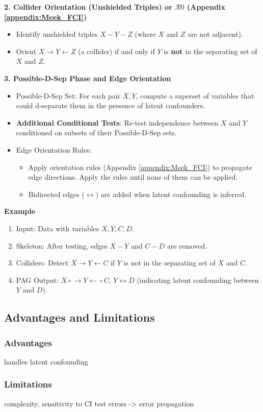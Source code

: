 \documentclass[main.tex]{subfiles}
\begin{document}
\textbf{2. Collider Orientation (Unshielded Triples) or $\mathcal{R}0$ (Appendix \ref{appendix:Meek_FCI})}
\begin{itemize}
  \item Identify unshielded triples $X - Y - Z$ (where $X$ and $Z$ are not adjacent).
  \item Orient $X \rightarrow Y \leftarrow Z$ (a collider) if and only if $Y$ is \textbf{not} in the separating set of $X$ and $Z$.
\end{itemize}

\textbf{3. Possible-D-Sep Phase and Edge Orientation}
\begin{itemize}
  \item Possible-D-Sep Set: For each pair $X, Y$, compute a superset of variables that could d-separate them in the presence of latent confounders.
  \item \textbf{Additional Conditional Tests}: Re-test independence between $X$ and $Y$ conditioned on subsets of their Possible-D-Sep sets.
  \item Edge Orientation Rules:
    \begin{itemize}
      \item Apply orientation rules (Appendix \ref{appendix:Meek_FCI}) to propagate edge directions. Apply the rules until none of them can be applied.
      \item Bidirected edges ($\leftrightarrow$) are added when latent confounding is inferred.
    \end{itemize}
\end{itemize}

\textbf{Example}
\begin{enumerate}
  \item Input: Data with variables $X, Y, C, D$.
  \item Skeleton: After testing, edges $X - Y$ and $C - D$ are removed.
  \item Colliders: Detect $X \rightarrow Y \leftarrow C$ if $Y$ is not in the separating set of $X$ and $C$.
  \item PAG Output: $X \circ\!\!\rightarrow Y \leftarrow\!\!\circ C$, $Y \leftrightarrow D$ (indicating latent confounding between $Y$ and $D$).
\end{enumerate}



\subsection{Advantages and Limitations}
\subsubsection*{Advantages}
 handles latent confounding
\subsubsection*{Limitations}
complexity, sensitivity to CI test errors -> error propagation

\end{document}
